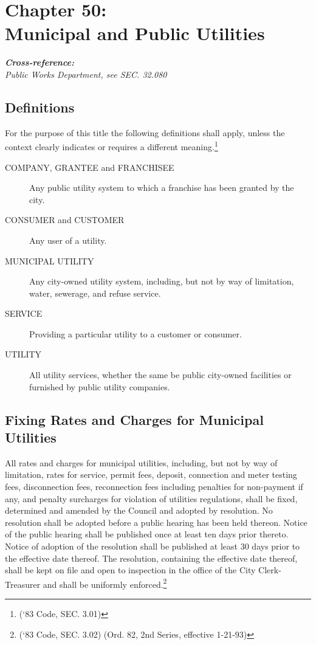 \chapter*{Chapter 50: \\
	Municipal and Public Utilities}
    \vfill
    \minitoc
    \textbf{\emph{{Cross-reference:}}}\\
    \indent\emph{Public Works Department, see SEC. 32.080}
    \pagebreak


\section{Definitions}
For the purpose of this title the following definitions shall apply, unless the context clearly indicates or requires a different meaning.\footnote{(‘83 Code, SEC. 3.01)}
\begin{description}
\item[COMPANY, GRANTEE and FRANCHISEE] Any public utility system to which a franchise has been granted by the city.
\item[CONSUMER and CUSTOMER] Any user of a utility.
\item[MUNICIPAL UTILITY] Any city-owned utility system, including, but not by way of limitation, water, sewerage, and refuse service.
\item[SERVICE] Providing a particular utility to a customer or consumer.
\item[UTILITY] All utility services, whether the same be public city-owned facilities or furnished by public utility companies.
\end{description}

\section{Fixing Rates and Charges for Municipal Utilities}
All rates and charges for municipal utilities, including, but not by way of limitation, rates for service, permit fees, deposit, connection and meter testing fees, disconnection fees, reconnection fees including penalties for non-payment if any, and penalty surcharges for violation of utilities regulations, shall be fixed, determined and amended by the Council and adopted by resolution.  No resolution shall be adopted before a public hearing has been held thereon.  Notice of the public hearing shall be published once at least ten days prior thereto.  Notice of adoption of the resolution shall be published at least 30 days prior to the effective date thereof.  The resolution, containing the effective date thereof, shall be kept on file and open to inspection in the office of the City Clerk-Treasurer and shall be uniformly enforced.\footnote{(‘83 Code, SEC. 3.02) (Ord. 82, 2nd Series, effective 1-21-93)}
